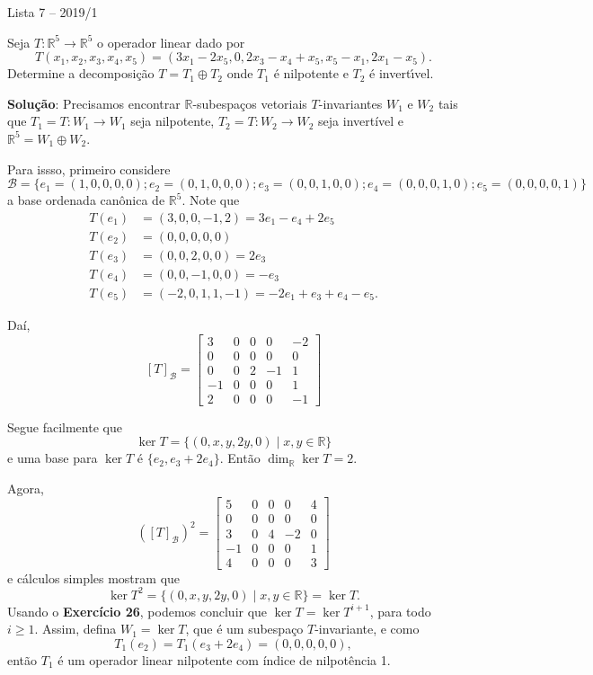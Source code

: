 \documentclass[12pt]{article}
\newcounter{exercicios}
\newcommand{\questao}{
\addtocounter{exercicios}{27}
\noindent{\bf Exerc{\'\i}cio \arabic{exercicios}: }}
\newcommand{\real}{\mathbb{R}}
\begin{document}
\begin{center}
    Lista 7 -- 2019/1
\end{center}
\questao Seja $T : \real^5 \to \real^5$ o operador linear dado por
  \[
      T(x_1,x_2,x_3,x_4,x_5) = (3x_1 -2x_5, 0 , 2x_3 - x_4 + x_5, x_5 - x_1, 2x_1 - x_5).
  \]
  Determine a decomposi\c{c}\~ao $T = T_1 \oplus T_2$ onde $T_1$ \'e nilpotente e $T_2$ \'e invert{\'\i}vel.

\textbf{Solu{\c c}{\~a}o}: Precisamos encontrar $\real$-subespaços vetoriais $T$-invariantes $W_1$ e $W_2$ tais que $T_1 = T : W_1 \to W_1$ seja nilpotente, $T_2 = T : W_2 \to W_2$ seja invertível e $\real^5 = W_1 \oplus W_2$.

Para issso, primeiro considere
\[
    \mathcal{B} = \{e_1 = (1,0,0,0,0); e_2 = (0,1,0,0,0); e_3 = (0,0,1,0,0); e_4 = (0,0,0,1,0); e_5 = (0,0,0,0,1)\}
\]
a base ordenada canônica de $\real^5$. Note que
\begin{align*}
	T(e_1) &= (3,0,0,-1,2) = 3e_1 - e_4 + 2e_5\\
	T(e_2) &= (0,0,0,0,0)\\
	T(e_3) &= (0,0,2,0,0) = 2e_3\\
	T(e_4) &= (0,0,-1,0,0) = -e_3\\
	T(e_5) &= (-2,0,1,1,-1) = -2e_1 + e_3 + e_4 - e_5.
\end{align*}

Daí,
\[
    [T]_\mathcal{B} = \begin{bmatrix}
        3 & 0 & 0 & 0 & -2\\
        0 & 0 & 0 & 0 & 0\\
        0 & 0 & 2 & -1 & 1\\
        -1 & 0 & 0 & 0 & 1\\
        2 & 0 & 0 & 0 & -1
    \end{bmatrix}
\]

Segue facilmente que
\[
 	\ker T = \{(0,x,y,2y,0)\mid x, y \in \real\}
\]
e uma base para $\ker T$ é $\{e_2, e_3 + 2e_4\}$. Então $\dim_\real\ker T = 2$.

Agora,
\[
    ([T]_\mathcal{B})^2 = \begin{bmatrix}
        5 & 0 & 0 & 0 & 4\\
        0 & 0 & 0 & 0 & 0\\
        3 & 0 & 4 & -2 & 0\\
        -1 & 0 & 0 & 0 & 1\\
        4 & 0 & 0 & 0 & 3
    \end{bmatrix}
\]
e cálculos simples mostram que
\[
    \ker T^2 = \{(0,x,y,2y,0)\mid x, y \in \real\} = \ker T.
\]
Usando o \textbf{Exercício 26}, podemos concluir que $\ker T = \ker T^{i + 1}$, para todo $i \ge 1$.
Assim, defina $W_1 = \ker T$, que é um subespaço $T$-invariante, e como
\[
	T_1(e_2) = T_1(e_3 + 2e_4) = (0,0,0,0,0),
\]
então $T_1$ é um operador linear nilpotente com índice de nilpotência 1.
\end{document}
